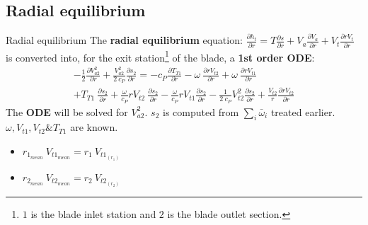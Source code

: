 \subsection{Radial equilibrium}
	\begin{frame}{Radial equilibrium}
		The \textbf{radial equilibrium} equation: $\frac{\partial h_t}{\partial r} = T \frac{\partial s}{\partial r} + V_a \frac{\partial V_a}{\partial r} + V_t \frac{\partial r V_t}{\partial r}$ is converted into, for the exit station\footnote{$1$ is the blade inlet station and $2$ is the blade outlet section.} of the blade, a \textbf{1st order ODE}:
		\begin{equation}
			\begin{split}
				- \frac{1}{2} \frac{\partial V_{a2}^2}{\partial r} + \frac{V_{a2}^2}{2 \ c_P} \frac{\partial s_{2}}{\partial r} = - c_P \frac{\partial T_{T1}}{\partial r} - \omega \ \frac{\partial r V_{t2}}{\partial r} + \omega \ \frac{\partial r V_{t1}}{\partial r} \\ + T_{T1} \ \frac{\partial s_2}{\partial r} + \frac{\omega}{c_P} r V_{t2} \ \frac{\partial s_2}{\partial r} - \frac{\omega}{c_P} r V_{t1} \frac{\partial s_2}{\partial r} - \frac{1}{2 \ c_P} V_{t2}^2 \frac{\partial s_2}{\partial r} + \frac{V_{t2}}{r} \frac{\partial r V_{t2}}{\partial r}	
			\nonumber
			\end{split}
		\end{equation}
	The \textbf{ODE} will be solved for $V_{a2}^2$.
	\newline
		$s_2$ is computed from $\sum_i \bar{\omega}_{i}$ treated earlier. 
	\newline 
		$\omega, V_{t1}, V_{t2} \& T_{T1}$ are known.
		\begin{itemize}
			\item $r_{1_{mean}} \ V_{t1_{mean}} = r_{1} \ V_{t1_{(r_1)}}$
			\item $r_{2_{mean}} \ V_{t2_{mean}} = r_{2} \ V_{t2_{(r_2)}}$
		\end{itemize}
	\end{frame}
